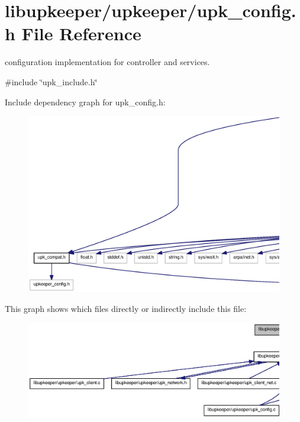 \section{libupkeeper/upkeeper/upk\_\-config.h File Reference}
\label{upk__config_8h}


configuration implementation for controller and services.  


{\ttfamily \#include \char`\"{}upk\_\-include.h\char`\"{}}\par
Include dependency graph for upk\_\-config.h:
\nopagebreak
\begin{figure}[H]
\begin{center}
\leavevmode
\includegraphics[width=400pt]{upk__config_8h__incl}
\end{center}
\end{figure}
This graph shows which files directly or indirectly include this file:\nopagebreak
\begin{figure}[H]
\begin{center}
\leavevmode
\includegraphics[width=400pt]{upk__config_8h__dep__incl}
\end{center}
\end{figure}
